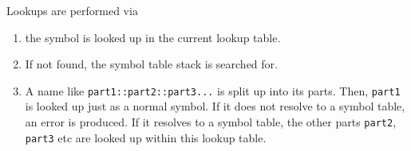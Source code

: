 \documentclass[12pt]{article}
\begin{document}
Lookups are performed via

\begin{enumerate}
\item the symbol is looked up in the current lookup table.
\item If not found, the symbol table stack is searched for.
\item A name like \texttt{part1::part2::part3...} is split up into its parts. Then,
\texttt{part1} is looked up just as a normal symbol. If it does not resolve to a symbol
table, an error is produced. If it resolves to a symbol table, the other parts
\texttt{part2}, \texttt{part3} etc are looked up within this lookup table.
\end{enumerate}
\end{document}
